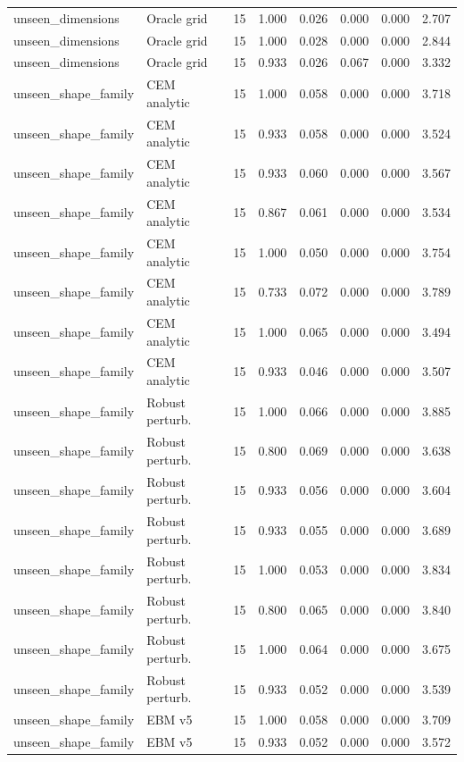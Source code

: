 {\begin{longtable}{llrrrrrr}
unseen\_dimensions & Oracle grid & 15 & 1.000 & 0.026 & 0.000 & 0.000 & 2.707 \\
unseen\_dimensions & Oracle grid & 15 & 1.000 & 0.028 & 0.000 & 0.000 & 2.844 \\
unseen\_dimensions & Oracle grid & 15 & 0.933 & 0.026 & 0.067 & 0.000 & 3.332 \\
unseen\_shape\_family & CEM analytic & 15 & 1.000 & 0.058 & 0.000 & 0.000 & 3.718 \\
unseen\_shape\_family & CEM analytic & 15 & 0.933 & 0.058 & 0.000 & 0.000 & 3.524 \\
unseen\_shape\_family & CEM analytic & 15 & 0.933 & 0.060 & 0.000 & 0.000 & 3.567 \\
unseen\_shape\_family & CEM analytic & 15 & 0.867 & 0.061 & 0.000 & 0.000 & 3.534 \\
unseen\_shape\_family & CEM analytic & 15 & 1.000 & 0.050 & 0.000 & 0.000 & 3.754 \\
unseen\_shape\_family & CEM analytic & 15 & 0.733 & 0.072 & 0.000 & 0.000 & 3.789 \\
unseen\_shape\_family & CEM analytic & 15 & 1.000 & 0.065 & 0.000 & 0.000 & 3.494 \\
unseen\_shape\_family & CEM analytic & 15 & 0.933 & 0.046 & 0.000 & 0.000 & 3.507 \\
unseen\_shape\_family & Robust perturb. & 15 & 1.000 & 0.066 & 0.000 & 0.000 & 3.885 \\
unseen\_shape\_family & Robust perturb. & 15 & 0.800 & 0.069 & 0.000 & 0.000 & 3.638 \\
unseen\_shape\_family & Robust perturb. & 15 & 0.933 & 0.056 & 0.000 & 0.000 & 3.604 \\
unseen\_shape\_family & Robust perturb. & 15 & 0.933 & 0.055 & 0.000 & 0.000 & 3.689 \\
unseen\_shape\_family & Robust perturb. & 15 & 1.000 & 0.053 & 0.000 & 0.000 & 3.834 \\
unseen\_shape\_family & Robust perturb. & 15 & 0.800 & 0.065 & 0.000 & 0.000 & 3.840 \\
unseen\_shape\_family & Robust perturb. & 15 & 1.000 & 0.064 & 0.000 & 0.000 & 3.675 \\
unseen\_shape\_family & Robust perturb. & 15 & 0.933 & 0.052 & 0.000 & 0.000 & 3.539 \\
unseen\_shape\_family & EBM v5 & 15 & 1.000 & 0.058 & 0.000 & 0.000 & 3.709 \\
unseen\_shape\_family & EBM v5 & 15 & 0.933 & 0.052 & 0.000 & 0.000 & 3.572 \\

\end{longtable}}
